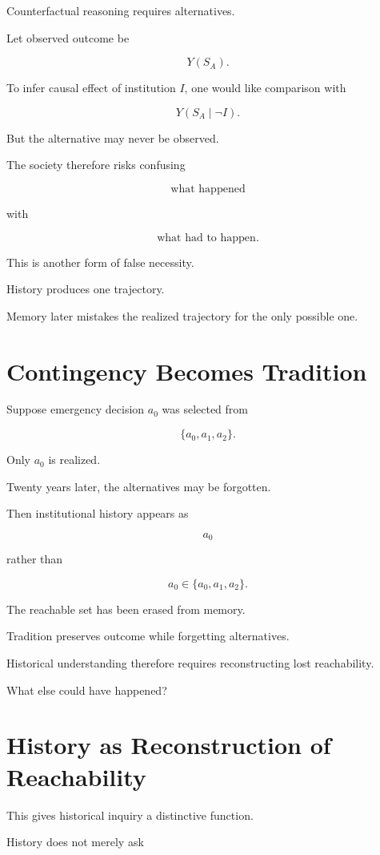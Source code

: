 \documentclass[11pt,oneside]{book}
\theoremstyle{definition}
\theoremstyle{remark}
\begin{document}
Counterfactual reasoning requires alternatives.

Let observed outcome be

\[
Y(S_A).
\]

To infer causal effect of institution \(I\), one would like comparison with

\[
Y(S_A\mid\neg I).
\]

But the alternative may never be observed.

The society therefore risks confusing

\[
\text{what happened}
\]

with

\[
\text{what had to happen}.
\]

This is another form of false necessity.

History produces one trajectory.

Memory later mistakes the realized trajectory for the only possible one.

\section{Contingency Becomes Tradition}

Suppose emergency decision \(a_0\) was selected from

\[
\{a_0,a_1,a_2\}.
\]

Only \(a_0\) is realized.

Twenty years later, the alternatives may be forgotten.

Then institutional history appears as

\[
a_0
\]

rather than

\[
a_0\in\{a_0,a_1,a_2\}.
\]

The reachable set has been erased from memory.

Tradition preserves outcome while forgetting alternatives.

Historical understanding therefore requires reconstructing lost reachability.

What else could have happened?

\section{History as Reconstruction of Reachability}

This gives historical inquiry a distinctive function.

History does not merely ask
\end{document}
